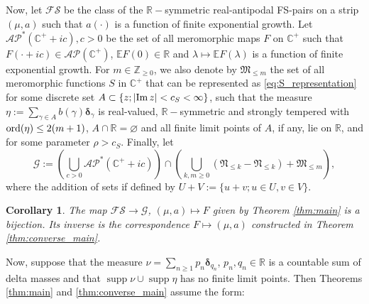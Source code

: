 \documentclass[a4paper,reqno,12pt]{amsart}
\DeclareMathOperator{\supp}{\mathrm{supp}}
\newtheorem{corollary}[theorem]{Corollary}
\newcommand{\A}{\mathcal{A}}
\newcommand{\F}{\mathcal{F}}
\newcommand{\G}{\mathcal{G}}
\renewcommand{\P}{\mathcal{P}}
\renewcommand{\S}{\mathcal{S}}
\newcommand{\MM}{\mathfrak{M}}
\newcommand{\NN}{\mathfrak{N}}
\newcommand{\z}{\mathbb{Z}}
\renewcommand{\r}{\mathbb{R}}
\newcommand{\cp}{\mathbb{C}} %
\newcommand{\bo}{\boldsymbol}
\newcommand{\la}{\lambda}
\newcommand{\ga}{\gamma}
\newcommand{\ord}{{\rm ord}}
\newcommand{\cd}{\cdot}
\newcommand{\1}{{\bf 1}}
\newcommand{\ra}{\rightarrow}
\newcommand{\e}{\mathbb{E}}
\newcommand{\mt}{\mapsto}
\newcommand{\del}{{\bo \delta}}
\renewcommand{\Im}{{\rm Im}\,}
\begin{document}
Now, let $\F\S$ be the class of the $\r-$symmetric real-antipodal FS-pairs on a strip $(\mu,a)$ such that $a(\cd)$ is a function of finite exponential growth. Let $\A\P^*(\cp^++ic),c>0$ be the set of all meromorphic maps $F$ on $\cp^+$ such that $F(\cd+ic)\in\A\P(\cp^+)$, $\e F(0)\in\r$ and $\la\mt\e F(\la)$ is a function of finite exponential growth. For $m\in\z_{\geq0}$, we also denote by $\MM_{\leq m}$ the set of all meromorphic functions $S$ in $\cp^+$ that can be represented as \eqref{eq:S_representation} for some discrete set $A\subset\{z;|\Im{z}|<c_S<\infty\}$, such that the measure $\eta:=\sum_{\ga\in A} b(\ga)\del_\ga$ is real-valued, $\r-$symmetric and strongly tempered with $\ord(\eta)\leq 2(m+1)$, $A\cap\r=\varnothing$ and all finite limit points of $A$, if any, lie on $\r$, and for some parameter $\rho>c_S$. Finally, let
\begin{equation*}
    \G:=\left(\bigcup_{c>0} \A\P^*(\cp^++ic)\right)\cap\left(\bigcup_{k,m\geq0} \left(\NN_{\leq k}-\NN_{\leq k}\right)+\MM_{\leq m}\right),
\end{equation*}
where the addition of sets if defined by $U+V:=\{u+v;u\in U,v\in V\}$.
\begin{corollary}
\label{cor:bijection}
    The map $\F\S\ra\G$, $(\mu,a)\mt F$ given by Theorem \ref{thm:main} is a bijection. Its inverse is the correspondence $F\mt (\mu,a)$ constructed in Theorem \ref{thm:converse_main}.
\end{corollary}
Now, suppose that the measure $\nu=\sum_{n\geq1} p_n\del_{q_n}$, $p_n,q_n\in\r$ is a countable sum of delta masses and that $\supp{\nu}\cup\supp{\eta}$ has no finite limit points. Then Theorems \ref{thm:main} and \ref{thm:converse_main} assume the form:
\end{document}

